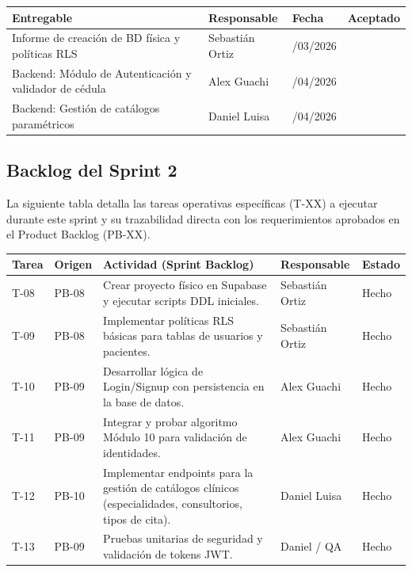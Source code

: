\documentclass[a4paper,12pt]{article}
\renewcommand{\arraystretch}{1.1}
\begin{document}
\footnotesize
\renewcommand{\arraystretch}{1.2}
\begin{tabularx}{\textwidth}{|>{\raggedright\arraybackslash}X|>{\centering\arraybackslash}p{2.5cm}|>{\centering\arraybackslash}p{2.0cm}|>{\centering\arraybackslash}p{1.5cm}|}
\hline
\textbf{Entregable} & \textbf{Responsable} & \textbf{Fecha} & \textbf{Aceptado} \\
\hline
Informe de creación de BD física y políticas RLS & Sebastián Ortiz & 25/03/2026 &  \\
\hline
Backend: Módulo de Autenticación y validador de cédula & Alex Guachi & 07/04/2026 &  \\
\hline
Backend: Gestión de catálogos paramétricos & Daniel Luisa & 08/04/2026 &  \\
\hline
\end{tabularx}
\normalsize

\subsection{Backlog del Sprint 2}
La siguiente tabla detalla las tareas operativas específicas (T-XX) a ejecutar durante este sprint y su trazabilidad directa con los requerimientos aprobados en el Product Backlog (PB-XX).

\renewcommand{\arraystretch}{1.25}
\begin{tabularx}{\textwidth}{|p{}|p{}|X|p{}|p{}|}
\hline
\textbf{Tarea} & \textbf{Origen} & \textbf{Actividad (Sprint Backlog)} & \textbf{Responsable} & \textbf{Estado} \\
\hline
T-08 & PB-08 & Crear proyecto físico en Supabase y ejecutar scripts DDL iniciales. & Sebastián Ortiz & Hecho \\
\hline
T-09 & PB-08 & Implementar políticas RLS básicas para tablas de usuarios y pacientes. & Sebastián Ortiz & Hecho \\
\hline
T-10 & PB-09 & Desarrollar lógica de Login/Signup con persistencia en la base de datos. & Alex Guachi & Hecho \\
\hline
T-11 & PB-09 & Integrar y probar algoritmo Módulo 10 para validación de identidades. & Alex Guachi & Hecho \\
\hline
T-12 & PB-10 & Implementar endpoints para la gestión de catálogos clínicos (especialidades, consultorios, tipos de cita). & Daniel Luisa & Hecho \\
\hline
T-13 & PB-09 & Pruebas unitarias de seguridad y validación de tokens JWT. & Daniel / QA & Hecho \\
\hline
\end{tabularx}
\end{document}
